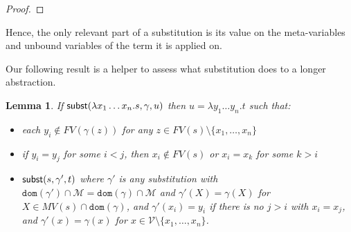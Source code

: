 \documentclass{lmcs}
\theoremstyle{theorem}\newtheorem{theorem}{Theorem}
\theoremstyle{theorem}\newtheorem{lemma}[theorem]{Lemma}
\theoremstyle{theorem}\newtheorem{corollary}[theorem]{Corollary}
\theoremstyle{definition}\newtheorem{definition}[theorem]{Definition}
\theoremstyle{definition}\newtheorem{example}[theorem]{Example}
\newcommand{\V}{\mathcal{V}}
\newcommand{\M}{\mathcal{M}}
\newcommand{\FV}{\mathit{FV}}
\newcommand{\FMV}{\mathit{MV}}
\newcommand{\domain}{\mathtt{dom}}
\newcommand{\avar}{x}
\newcommand{\bvar}{y}
\newcommand{\cvar}{z}
\newcommand{\Avar}{X}
\newcommand{\abs}[2]{\lambda #1.#2}
\newcommand{\meta}[2]{#1\langle#2\rangle}
\begin{document}
\begin{proof}
\end{proof}

Hence, the only relevant part of a substitution is its value on the
meta-variables and unbound variables of the term it is applied on.

Our following result is a helper to assess what substitution does to a longer
abstraction.

\begin{lemma}\label{lem:abssubst}
If $\subrel{\abs{\avar_1 \dots \avar_n}{s},\gamma,u}$ then $u = \abs{\bvar_1
\dots \bvar_n}{t}$ such that:
\begin{itemize}
\item each $\bvar_i \notin \FV(\gamma(\cvar))$ for any $\cvar \in \FV(s)
  \setminus \{\avar_1,\dots,\avar_n\}$
\item if $\bvar_i = \bvar_j$ for some $i < j$, then $\avar_i \notin \FV(s)$ or
  $\avar_i = \avar_k$ for some $k > i$ 
\item $\mathsf{subst}(s,\gamma',t)$ where $\gamma'$ is any substitution with
  $\domain(\gamma') \cap \M = \domain(\gamma) \cap \M$ and
  $\gamma'(\Avar) = \gamma(\Avar)$ for $\Avar \in \FMV(s) \cap \domain(\gamma)$,
  and $\gamma'(\avar_i) = \bvar_i$ if there is no $j > i$ with $\avar_i =
  \avar_j$, and $\gamma'(\avar) = \gamma(\avar)$ for $\avar \in \V \setminus
  \{\avar_1, \dots,\avar_n\}$.
\end{itemize}
\end{lemma}
\end{document}
